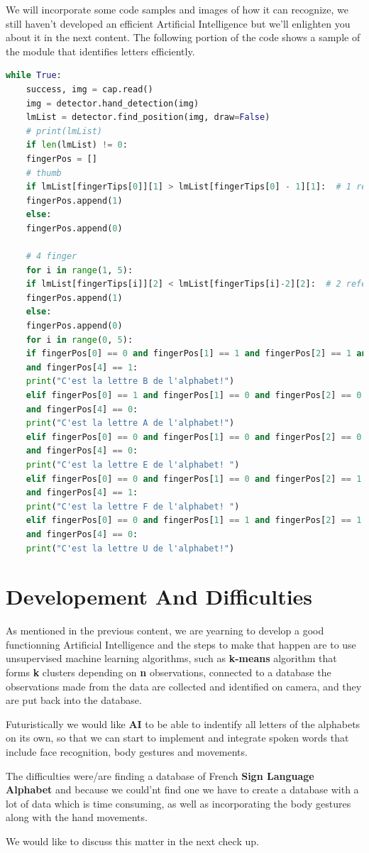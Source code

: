\documentclass{article}
\begin{document}
	We will incorporate some code samples and images of how it can recognize, we still haven't developed an efficient Artificial Intelligence but we'll enlighten you about it in the next content.
	The following portion of the code shows a sample of the module that identifies letters efficiently.
	\renewcommand\lstlistingname{Source code}
\renewcommand\lstlistlistingname{Source code}
\begin{lstlisting}[language=python,caption={Naive Hand Recognition},breaklines=true]
		while True:
	success, img = cap.read()
	img = detector.hand_detection(img)
	lmList = detector.find_position(img, draw=False)
	# print(lmList)
	if len(lmList) != 0:
	fingerPos = []
	# thumb
	if lmList[fingerTips[0]][1] > lmList[fingerTips[0] - 1][1]:  # 1 refers t x
	fingerPos.append(1)
	else:
	fingerPos.append(0)
	
	# 4 finger
	for i in range(1, 5):
	if lmList[fingerTips[i]][2] < lmList[fingerTips[i]-2][2]:  # 2 refers t y
	fingerPos.append(1)
	else:
	fingerPos.append(0)
	for i in range(0, 5):
	if fingerPos[0] == 0 and fingerPos[1] == 1 and fingerPos[2] == 1 and fingerPos[3] == 1 \
	and fingerPos[4] == 1:
	print("C'est la lettre B de l'alphabet!")
	elif fingerPos[0] == 1 and fingerPos[1] == 0 and fingerPos[2] == 0 and fingerPos[3] == 0 \
	and fingerPos[4] == 0:
	print("C'est la lettre A de l'alphabet!")
	elif fingerPos[0] == 0 and fingerPos[1] == 0 and fingerPos[2] == 0 and fingerPos[3] == 0 \
	and fingerPos[4] == 0:
	print("C'est la lettre E de l'alphabet! ")
	elif fingerPos[0] == 0 and fingerPos[1] == 0 and fingerPos[2] == 1 and fingerPos[3] == 1 \
	and fingerPos[4] == 1:
	print("C'est la lettre F de l'alphabet! ")
	elif fingerPos[0] == 0 and fingerPos[1] == 1 and fingerPos[2] == 1 and fingerPos[3] == 0 \
	and fingerPos[4] == 0:
	print("C'est la lettre U de l'alphabet!")
\end{lstlisting}	
	
	\section{Developement And Difficulties}\label{sec:third}
	
	
	As mentioned in the previous content, we are yearning to develop a good functionning Artificial Intelligence and the steps to make that happen are to use unsupervised machine learning algorithms, such as \textbf{k-means} algorithm that forms \textbf{k} clusters depending on \textbf{n} observations, connected to a database the observations made from the data are collected and identified on camera, and they are put back into the database.
	
	Futuristically we would like \textbf{AI} to be able to indentify all letters of the alphabets on its own, so that we can start to implement and integrate spoken words that include face recognition, body gestures and movements. 
	
	The difficulties were/are finding a database of French \textbf{Sign Language Alphabet} and because we could'nt find one we have to create a database with a lot of data which is time consuming, as well as incorporating the body gestures along with the hand movements. 
	
	We would like to discuss this matter in the next check up.
	
	
	
\end{document}
